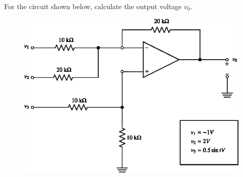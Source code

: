 \eject

\begin{example}%
For the circuit shown below, calculate the output voltage $v_{0}$.
\begin{figure}[H]
\centering
\includegraphics{chap4/exp4.29.eps}
\end{figure}
\end{example}

